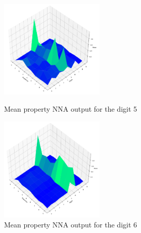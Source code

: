 \documentclass[conference]{IEEEtran}
\begin{document}
\begin{figure}[htbp]
\begin{minipage}{0.48\textwidth}
\centerline{\includegraphics[width=50mm]{./images/digit-5.png}}
\caption{Mean property NNA output for the digit 5}
\label{digit5votes}
\end{minipage}\hfill
\begin{minipage}{0.48\textwidth}
\centerline{\includegraphics[width=50mm]{./images/digit-6.png}}
\caption{Mean property NNA output for the digit 6}
\label{digit6votes}
\end{minipage}
\end{figure}

\end{document}
